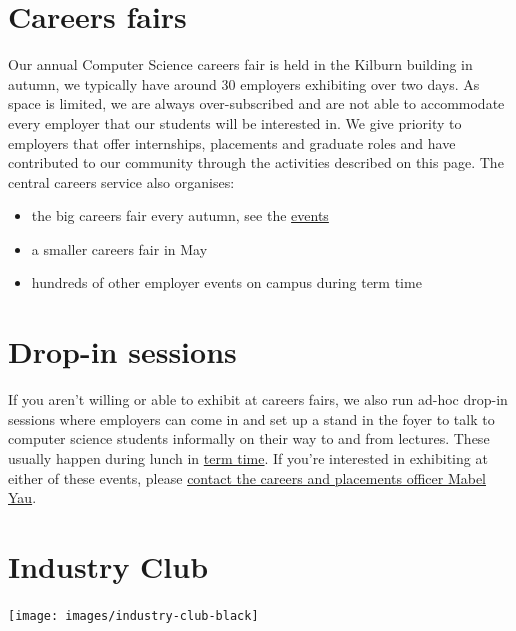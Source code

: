 \documentclass[
  12pt,
]{book}
\providecommand{\tightlist}{%
  \setlength{\itemsep}{0pt}\setlength{\parskip}{0pt}}
\begin{document}
\hypertarget{careersfairs}{%
\section{Careers fairs}\label{careersfairs}}

Our annual Computer Science careers fair is held in the Kilburn building in autumn, we typically have around 30 employers exhibiting over two days. As space is limited, we are always over-subscribed and are not able to accommodate every employer that our students will be interested in. We give priority to employers that offer internships, placements and graduate roles and have contributed to our community through the activities described on this page. The central careers service also organises:

\begin{itemize}
\tightlist
\item
  the big careers fair every autumn, see the \href{https://www.careers.manchester.ac.uk/events/}{events}
\item
  a smaller careers fair in May
\item
  hundreds of other employer events on campus during term time \citep{highfliers2020}
\end{itemize}

\hypertarget{dropins}{%
\section{Drop-in sessions}\label{dropins}}

If you aren't willing or able to exhibit at careers fairs, we also run ad-hoc drop-in sessions where employers can come in and set up a stand in the foyer to talk to computer science students informally on their way to and from lectures. These usually happen during lunch in \href{https://www.manchester.ac.uk/discover/key-dates/}{term time}. If you're interested in exhibiting at either of these events, please \protect\hyperlink{office}{contact the careers and placements officer Mabel Yau}.

\hypertarget{industryclub}{%
\section{Industry Club}\label{industryclub}}

\begin{center}\texttt{[image: images/industry-club-black]} \end{center}
\end{document}
